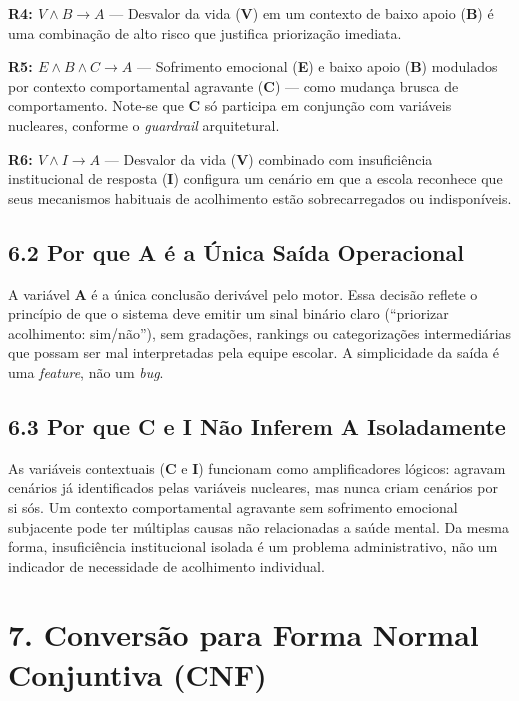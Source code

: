 \documentclass[11pt]{article}
\begin{document}
\textbf{R4: \(V \land B \rightarrow A\)} --- Desvalor da vida
(\textbf{V}) em um contexto de baixo apoio (\textbf{B}) é uma combinação
de alto risco que justifica priorização imediata.

\textbf{R5: \(E \land B \land C \rightarrow A\)} --- Sofrimento
emocional (\textbf{E}) e baixo apoio (\textbf{B}) modulados por contexto
comportamental agravante (\textbf{C}) --- como mudança brusca de
comportamento. Note-se que \textbf{C} só participa em conjunção com
variáveis nucleares, conforme o \emph{guardrail} arquitetural.

\textbf{R6: \(V \land I \rightarrow A\)} --- Desvalor da vida
(\textbf{V}) combinado com insuficiência institucional de resposta
(\textbf{I}) configura um cenário em que a escola reconhece que seus
mecanismos habituais de acolhimento estão sobrecarregados ou
indisponíveis.

\subsection{6.2 Por que A é a Única Saída
Operacional}\label{por-que-a-uxe9-a-uxfanica-sauxedda-operacional}

A variável \textbf{A} é a única conclusão derivável pelo motor. Essa
decisão reflete o princípio de que o sistema deve emitir um sinal
binário claro (``priorizar acolhimento: sim/não''), sem gradações,
rankings ou categorizações intermediárias que possam ser mal
interpretadas pela equipe escolar. A simplicidade da saída é uma
\emph{feature}, não um \emph{bug}.

\subsection{6.3 Por que C e I Não Inferem A
Isoladamente}\label{por-que-c-e-i-nuxe3o-inferem-a-isoladamente}

As variáveis contextuais (\textbf{C} e \textbf{I}) funcionam como
amplificadores lógicos: agravam cenários já identificados pelas
variáveis nucleares, mas nunca criam cenários por si sós. Um contexto
comportamental agravante sem sofrimento emocional subjacente pode ter
múltiplas causas não relacionadas a saúde mental. Da mesma forma,
insuficiência institucional isolada é um problema administrativo, não um
indicador de necessidade de acolhimento individual.

    \section{7. Conversão para Forma Normal Conjuntiva
(CNF)}\label{conversuxe3o-para-forma-normal-conjuntiva-cnf}
\end{document}
